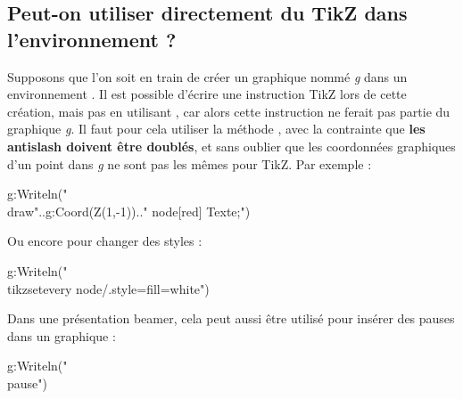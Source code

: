 \subsection{Peut-on utiliser directement du TikZ dans l'environnement \luadrawenv ?}

Supposons que l'on soit en train de créer un graphique nommé \emph{g} dans un environnement \luadrawenv. Il est possible d'écrire une instruction TikZ lors de cette création, mais pas en utilisant , car alors cette instruction ne ferait pas partie du graphique \emph{g}. Il faut pour cela utiliser la méthode , avec la contrainte que \textbf{les antislash doivent être doublés}, et sans oublier que les coordonnées graphiques d'un point dans \emph{g} ne sont pas les mêmes pour TikZ. Par exemple : 

\begin{Luacode}
g:Writeln("\\draw"..g:Coord(Z(1,-1)).." node[red] {Texte};")
\end{Luacode}

Ou encore pour changer des styles :
\begin{Luacode}
g:Writeln("\\tikzset{every node/.style={fill=white}}")
\end{Luacode}

Dans une présentation beamer, cela peut aussi être utilisé pour insérer des pauses dans un graphique :
\begin{Luacode}
g:Writeln("\\pause")
\end{Luacode}  
